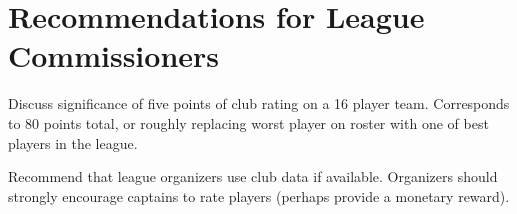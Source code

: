 \section{Recommendations for League Commissioners}\label{sec:recommendations}

Discuss significance of five points of club rating on a 16 player team.  Corresponds to 80 points total, or roughly replacing worst player on roster with one of best players in the league.

Recommend that league organizers use club data if available.  Organizers should strongly encourage captains to rate players (perhaps provide a monetary reward).